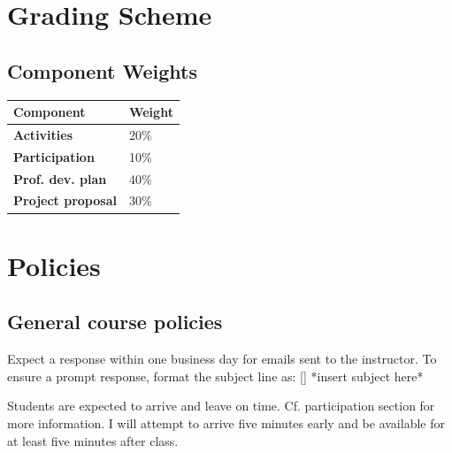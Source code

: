 \documentclass{syllabus}
\begin{document}
\section*{Grading Scheme}
\subsection*{Component Weights}

\noindent\begin{tabular}{ll}
\textbf{Component} & \textbf{Weight}       \\ \hline
\textbf{Activities}            & 20\%       \\
\textbf{Participation}            & 10\%  \\
\textbf{Prof. dev. plan}            &     40\%   \\
\textbf{Project proposal}            & 30\%       \\
\end{tabular}%




\section*{Policies}
\subsection{General course policies}
Expect a response within one business day for emails sent to the instructor. To ensure a prompt response, format the subject line as: [\coursecode] *insert subject here*

Students are expected to arrive and leave on time. Cf. participation section for more information. I will attempt to arrive five minutes early and be available for at least five minutes after class.

\end{document}
